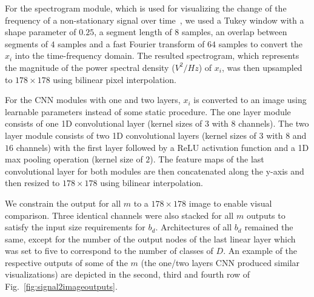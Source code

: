 \documentclass[conference]{IEEEtran}
\begin{document}
For the spectrogram module, which is used for visualizing the change of the frequency of a non-stationary signal over time~\cite{oppenheim1999discrete}, we used a Tukey window with a shape parameter of $0.25$, a segment length of $8$ samples, an overlap between segments of $4$ samples and a fast Fourier transform of $64$ samples to convert the $x_i$ into the time-frequency domain.
The resulted spectrogram, which represents the magnitude of the power spectral density ($V^2/Hz$) of $x_i$, was then upsampled to $178\times 178$ using bilinear pixel interpolation.

For the CNN modules with one and two layers, $x_i$ is converted to an image using learnable parameters instead of some static procedure.
The one layer module consists of one 1D convolutional layer (kernel sizes of $3$ with $8$ channels).
The two layer module consists of two 1D convolutional layers (kernel sizes of $3$ with $8$ and $16$ channels) with the first layer followed by a ReLU activation function and a 1D max pooling operation (kernel size of $2$).
The feature maps of the last convolutional layer for both modules are then concatenated along the y-axis and then resized to $178\times 178$ using bilinear interpolation.

We constrain the output for all $m$ to a $178\times 178$ image to enable visual comparison.
Three identical channels were also stacked for all $m$ outputs to satisfy the input size requirements for $b_d$.
Architectures of all $b_d$ remained the same, except for the number of the output nodes of the last linear layer which was set to five to correspond to the number of classes of $D$.
An example of the respective outputs of some of the $m$ (the one/two layers CNN produced similar visualizations) are depicted in the second, third and fourth row of Fig.~\ref{fig:signal2imageoutputs}.
\end{document}
